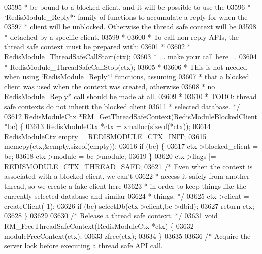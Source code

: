 \begin{DoxyCode}
{{{{{{{{{{03595 \textcolor{comment}{ * be bound to a blocked client, and it will be possible to use the}
03596 \textcolor{comment}{ * `RedisModule\_Reply*` family of functions to accumulate a reply for when the}
03597 \textcolor{comment}{ * client will be unblocked. Otherwise the thread safe context will be}
03598 \textcolor{comment}{ * detached by a specific client.}
03599 \textcolor{comment}{ *}
03600 \textcolor{comment}{ * To call non-reply APIs, the thread safe context must be prepared with:}
03601 \textcolor{comment}{ *}
03602 \textcolor{comment}{ *     RedisModule\_ThreadSafeCallStart(ctx);}
03603 \textcolor{comment}{ *     ... make your call here ...}
03604 \textcolor{comment}{ *     RedisModule\_ThreadSafeCallStop(ctx);}
03605 \textcolor{comment}{ *}
03606 \textcolor{comment}{ * This is not needed when using `RedisModule\_Reply*` functions, assuming}
03607 \textcolor{comment}{ * that a blocked client was used when the context was created, otherwise}
03608 \textcolor{comment}{ * no RedisModule\_Reply* call should be made at all.}
03609 \textcolor{comment}{ *}
03610 \textcolor{comment}{ * TODO: thread safe contexts do not inherit the blocked client}
03611 \textcolor{comment}{ * selected database. */}
03612 RedisModuleCtx *RM\_GetThreadSafeContext(RedisModuleBlockedClient *bc) \{
03613     RedisModuleCtx *ctx = zmalloc(\textcolor{keyword}{sizeof}(*ctx));
03614     RedisModuleCtx empty = \hyperlink{module_8c_a7a80fb134c35b70c7cfe920ea1033bcd}{REDISMODULE\_CTX\_INIT};
03615     memcpy(ctx,&empty,\textcolor{keyword}{sizeof}(empty));
03616     \textcolor{keywordflow}{if} (bc) \{
03617         ctx->blocked\_client = bc;
03618         ctx->module = bc->module;
03619     \}
03620     ctx->flags |= \hyperlink{module_8c_a884fbd2b3a1b008f1635afaeb87ca52a}{REDISMODULE\_CTX\_THREAD\_SAFE};
03621     \textcolor{comment}{/* Even when the context is associated with a blocked client, we can't}
03622 \textcolor{comment}{     * access it safely from another thread, so we create a fake client here}
03623 \textcolor{comment}{     * in order to keep things like the currently selected database and similar}
03624 \textcolor{comment}{     * things. */}
03625     ctx->client = createClient(-1);
03626     \textcolor{keywordflow}{if} (bc) selectDb(ctx->client,bc->dbid);
03627     \textcolor{keywordflow}{return} ctx;
03628 \}
03629 
03630 \textcolor{comment}{/* Release a thread safe context. */}
03631 \textcolor{keywordtype}{void} RM\_FreeThreadSafeContext(RedisModuleCtx *ctx) \{
03632     moduleFreeContext(ctx);
03633     zfree(ctx);
03634 \}
03635 
03636 \textcolor{comment}{/* Acquire the server lock before executing a thread safe API call.}
}}}}}}}}}}
\end{DoxyCode}
